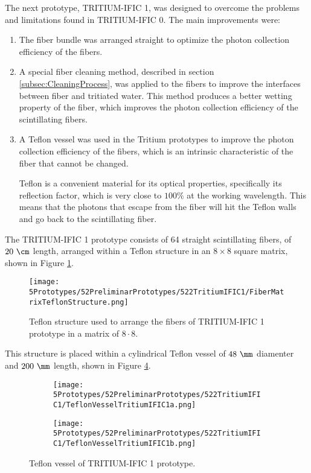 The next prototype, TRITIUM-IFIC 1, was designed to overcome the problems and limitations found in TRITIUM-IFIC 0. The main improvements were:

\begin{enumerate}

\item{} The fiber bundle was arranged straight to optimize the photon collection efficiency of the fibers.

\item{} A special fiber cleaning method, described in section \ref{subsec:CleaningProcess}, was applied to the fibers to improve the interfaces between fiber and tritiated water. This method produces a better wetting property of the fiber, which improves the photon collection efficiency of the scintillating fibers.

\item{} A Teflon vessel was used in the Tritium prototypes to improve the photon collection efficiency of the fibers, which is an intrinsic characteristic of the fiber that cannot be changed.

Teflon is a convenient material for its optical properties, specifically its reflection factor, which is very close to $100\%$ at the working wavelength. This means that the photons that escape from the fiber will hit the Teflon walls and go back to the scintillating fiber.

\end{enumerate}

The TRITIUM-IFIC 1 prototype consists of 64 straight scintillating fibers, of $20~\cm$ length, arranged within a Teflon structure in an $8\times 8$ square matrix, shown in Figure \ref{fig:TeflonStructureFibersTritiumIFIC1}.

\begin{figure}[h]
\centering
\texttt{[image: 5Prototypes/52PreliminarPrototypes/522TritiumIFIC1/FiberMatrixTeflonStructure.png]}
\caption{Teflon structure used to arrange the fibers of TRITIUM-IFIC 1 prototype in a matrix of $8\cdot{}8$.\label{fig:TeflonStructureFibersTritiumIFIC1}}
\end{figure}
This structure is placed within a cylindrical Teflon vessel of $48~\mm$ diamenter and $200~\mm$ length, shown in Figure \ref{fig:TeflonVesselTritumIFIC1}. 

\begin{figure}
\centering
    \begin{subfigure}[b]{0.30\textwidth}
    \centering
    \texttt{[image: 5Prototypes/52PreliminarPrototypes/522TritiumIFIC1/TeflonVesselTritiumIFIC1a.png]}  
    \caption{\label{subfig:TeflonVesselTritumIFIC1a}}
    \end{subfigure}
    \hfill
    \begin{subfigure}[b]{0.45\textwidth}
    \centering
    \texttt{[image: 5Prototypes/52PreliminarPrototypes/522TritiumIFIC1/TeflonVesselTritiumIFIC1b.png]}  
    \caption{\label{subfig:TeflonVesselTritumIFIC1b}}
    \end{subfigure}
 \caption{Teflon vessel of TRITIUM-IFIC 1 prototype.}
 \label{fig:TeflonVesselTritumIFIC1}
\end{figure}

